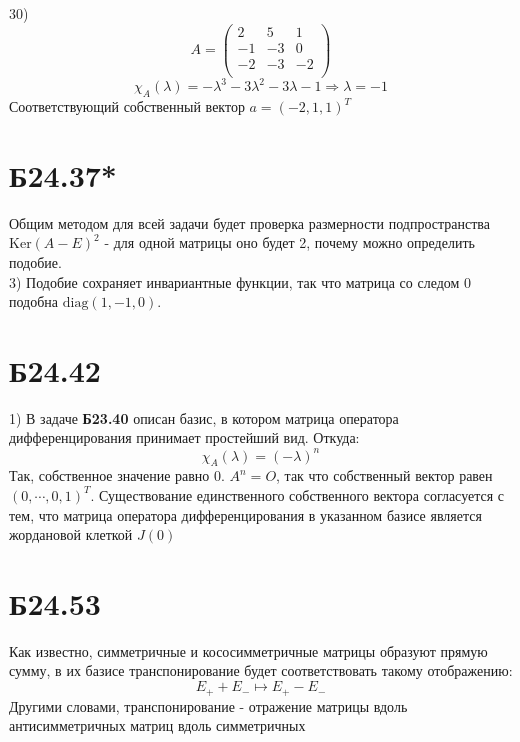 \documentclass[a4paper,12pt]{article} %
\begin{document}
30)$$A=\begin{pmatrix*}
    2&5&1\\
    -1&-3&0\\
    -2&-3&-2\\
\end{pmatrix*}$$
$$\chi_A(\lambda)=-\lambda^3-3\lambda^2-3\lambda-1\Rightarrow\lambda=-1$$
Соответствующий собственный вектор $a=(-2,1,1)^{T}$
\section*{Б24.37*}Общим методом для всей задачи будет проверка размерности подпространства $\mathrm{Ker}(A-E)^2$ - для одной матрицы оно будет 2, почему можно определить подобие.\\
3) Подобие сохраняет инвариантные функции, так что матрица со следом $0$ подобна $\mathrm{diag}(1,-1,0)$.
\section*{Б24.42}1) В задаче \textbf{Б23.40} описан базис, в котором матрица оператора дифференцирования принимает простейший вид. Откуда:
$$\chi_A(\lambda)=(-\lambda)^n$$
Так, собственное значение равно 0. $A^n=O$, так что собственный вектор равен $(0,\cdots,0,1)^{T}$. Существование единственного собственного вектора согласуется с тем, что матрица оператора дифференцирования в указанном базисе является жордановой клеткой $J(0)$
\section*{Б24.53} Как известно, симметричные и кососимметричные матрицы образуют прямую сумму, в их базисе транспонирование будет соответствовать такому отображению:
$$E_{+}+E_{-}\mapsto E_{+}-E_{-}$$
Другими словами, транспонирование - отражение матрицы вдоль антисимметричных матриц вдоль симметричных
\end{document}

